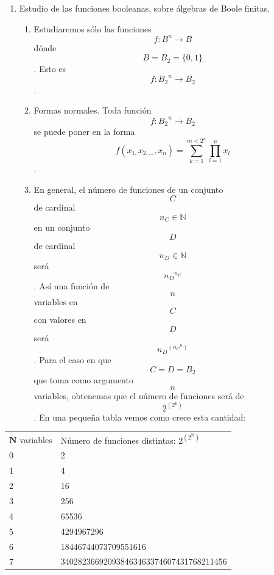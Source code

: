 \begin{enumerate}
\def\labelenumi{\arabic{enumi}.}
\item
  Estudio de las funciones booleanas, sobre álgebras de Boole finitas.

  \begin{enumerate}
  \def\labelenumii{\arabic{enumii}.}
  \tightlist
  \item
    Estudiaremos sólo las funciones \[f:{B^{n}\rightarrow B}\] dónde
    \[{B = B_{2}} = {\{ 0,1\}}\]. Esto es
    \[f:{{B_{2}}^{n}\rightarrow B_{2}}\].
  \item
    Formas normales. Toda función \[f:{{B_{2}}^{n}\rightarrow B_{2}}\]
    se puede poner en la forma
    \[f{{({x_{1,}x_{2,...},x_{n}})} = {\sum\limits_{k = 1}^{m < 2^{n}}{\prod\limits_{l = 1}^{n}x_{l}}}}\].
  \item
    En general, el número de funciones de un conjunto \[C\]de cardinal
    \[n_{C} \in \mathbb{N}\] en un conjunto \[D\]de cardinal
    \[n_{D} \in \mathbb{N}\]será \[{n_{D}}^{n_{C}}\]. Así una función de
    \[n\] variables en \[C\]con valores en \[D\]será
    \[{n_{D}}^{({n_{C}}^{n})}\]. Para el caso en que
    \[{C = D} = B_{2}\]que toma como argumento\[n\] variables, obtenemos
    que el número de funciones será de
    \[2^{(2^{\mathbf{\mathrm{n}}})}\]. En una pequeña tabla vemos como
    crece esta cantidad:
  \end{enumerate}
\end{enumerate}

{\def\LTcaptype{none} %
\begin{longtable}[]{@{}ll@{}}
\toprule\noalign{}
\endhead
\bottomrule\noalign{}
\endlastfoot
\(\mathbf{N}\) variables & Número de funciones distintas:
\(2^{(2^{\mathbf{\mathrm{N}}})}\) \\
0 & 2 \\
1 & 4 \\
2 & 16 \\
3 & 256 \\
4 & 65536 \\
5 & 4294967296 \\
6 & 18446744073709551616 \\
7 & 340282366920938463463374607431768211456 \\
\end{longtable}
}


